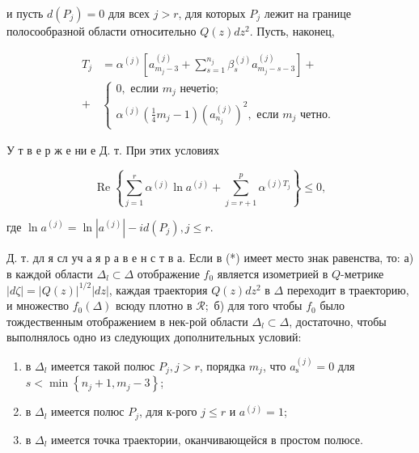 \documentclass[10pt]{article}
\begin{document}
и пусть $d\left(P_{j}\right)=0$ для всех $j>r$, для которых $P_{j}$ лежит на границе полосообразной области относительно $Q(z) d z^{2}$. Пусть, наконец,



\[

\begin{aligned}

T_{j} & =\alpha^{(j)}\left[a_{m_{j}-3}^{(j)}+\sum_{s=1}^{n_{j}} \beta_{s}^{(j)} a_{m_{j}-s-3}^{(j)}\right]+ \\

+ & \left\{\begin{array}{l}

0, \text { еслии } m_{j} \text { нечетіо; } \\

\alpha^{(j)}\left(\frac{1}{4} m_{j}-1\right)\left(a_{n_{j}}^{(j)}\right)^{2}, \text { если } m_{j} \text { четно. }

\end{array}\right.

\end{aligned}

\]



У т в е р ж е ни е Д. т. При этих условиях



\[

\operatorname{Re}\left\{\sum_{j=1}^{r} \alpha^{(j)} \ln a^{(j)}+\sum_{j=r+1}^{p} \alpha^{(j) T_{j}}\right\} \leqslant 0,

\]



где $\ln a^{(j)}=\ln \left|a^{(j)}\right|-i d\left(P_{j}\right), j \leqslant r$.



Д. т. дл я сл уч а я р а в е н с т в а. Если в (*) имеет место знак равенства, то: а) в каждой области $\Delta_{l} \subset \Delta$ отображение $f_{0}$ является изометрией в $Q$-метрике $|d \zeta|=|Q(z)|^{1 / 2}|d z|$, каждая траектория $Q(z) d z^{2}$ в $\Delta$ переходит в траекторию, и множество $f_{0}(\Delta)$ всюду плотно в $\mathscr{R} ;$ б) для того чтобы $f_{0}$ было тождественным отображением в нек-рой области $\Delta_{l} \subset \Delta$, достаточно, чтобы выполнялось одно из следующих дополнительных условий:



\begin{enumerate}

  \item в $\Delta_{l}$ имеется такой полюс $P_{j}, j>r$, порядка $m_{j}$, что $a_{\mathrm{s}}^{(j)}=0$ для $s<\min \left\{n_{j}+1, m_{j}-3\right\}$;



  \item в $\Delta_{l}$ имеется полюс $P_{j}$, для к-рого $j \leqslant r$ и $a^{(j)}=1$;



  \item в $\Delta_{l}$ имеется точка траектории, оканчивающейся в простом полюсе.



\end{enumerate}
\end{document}
